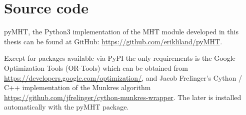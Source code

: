 
\chapter{Source code}
pyMHT, the Python3 implementation of the MHT module developed in this thesis can be found at GitHub: \url{https://github.com/erikliland/pyMHT}.

Except for packages available via PyPI the only requirements is the Google Optimization Tools (OR-Tools) which can be obtained from \url{https://developers.google.com/optimization/}, and Jacob Frelinger's Cython / C++ implementation of the Munkres algorithm \url{https://github.com/jfrelinger/cython-munkres-wrapper}. The later is installed automatically with the pyMHT package.